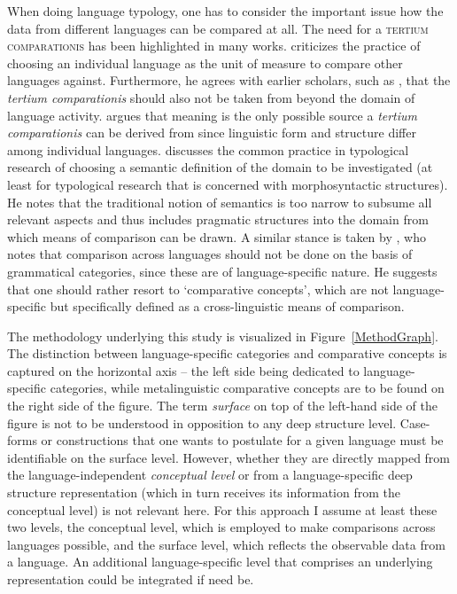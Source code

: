 When doing language typology, one has to consider the important issue how the data from different languages can be compared at all.  
The need for a \textsc{tertium comparationis} has been highlighted in many works.
\citet[28--19]{Seiler:2000} criticizes the practice of choosing an individual language as the unit of measure to compare other languages against.  
Furthermore, he agrees with earlier scholars, such as \citet{Heger:1990}, that the \textit{tertium comparationis} should also not be taken from beyond the domain of language activity.
\citet[185]{Wierzbicka:1995} argues that meaning is the only possible source a \textit{tertium comparationis} can be derived from since linguistic form and structure differ among individual languages.
\citet[13--14]{Croft:2003} discusses the common practice in typological research of choosing a semantic definition of the domain to be investigated (at least for typological research that is concerned with morphosyntactic structures). 
He notes that the traditional notion of semantics is too narrow to subsume all relevant aspects and thus includes pragmatic structures into the domain from which means of comparison can be drawn.
A similar stance is taken by \citet{Haspelmath.comp:2010}, who notes that comparison across languages should not be done on the basis of grammatical categories, since these are of language-specific nature. 
He suggests that one should rather resort to `comparative concepts', which are not language-specific but specifically defined as a cross-linguistic means of comparison. 

The methodology underlying this study is visualized in Figure~\ref{MethodGraph}. 
The distinction between language-specific categories and comparative concepts is captured on the horizontal axis -- the left side being dedicated to language-specific categories, while metalinguistic comparative concepts are to be found on the right side of the figure. 
The term \textit{surface} on top of the left-hand side of the figure is not to be understood in opposition to any deep structure level. 
Case-forms or constructions that one wants to postulate for a given language must be identifiable on the surface level. 
However, whether they are directly mapped from the language-independent \textit{conceptual level} or from a language-specific deep structure representation (which in turn receives its information from the conceptual level) is not relevant here. 
For this approach I assume at least these two levels, the conceptual level, which is employed to make comparisons across languages possible, and the surface level, which reflects the observable data from a language. 
An additional language-specific level that comprises an underlying representation could be integrated if need be. 

